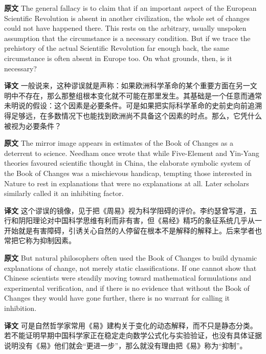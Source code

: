 \documentclass[UTF8,zihao=-4]{ctexart}
\newcommand{\BodyFont}{\fontsize{10.5pt}{15.5pt}\selectfont}
\newcommand{\origlabel}{\textbf{原文}\quad}
\newcommand{\translabel}{\textbf{译文}\quad}
\newenvironment{enblock}{\par\noindent\begingroup\BodyFont\origlabel}{\par\endgroup}
\newenvironment{zhblock}{\par\noindent\begingroup\BodyFont\translabel}{\par\endgroup\vspace{0.35em}}
\begin{document}
\begin{enblock}
The general fallacy is to claim that if an important aspect of the European Scientific Revolution is absent in another civilization, the whole set of changes could not have happened there. This rests on the arbitrary, usually unspoken assumption that the circumstance is a necessary condition. But if we trace the prehistory of the actual Scientific Revolution far enough back, the same circumstance is often absent in Europe too. On what grounds, then, is it necessary?
\end{enblock}
\begin{zhblock}
一般说来，这种谬误就是声称：如果欧洲科学革命的某个重要方面在另一文明中不存在，那么那整组根本变化就不可能在那里发生。其基础是一个任意而通常未明说的假设：这个因素是必要条件。可是如果把实际科学革命的史前史向前追溯得足够远，在多数情况下也能找到欧洲尚不具备这个因素的时点。那么，它凭什么被视为必要条件？
\end{zhblock}

\begin{enblock}
The mirror image appears in estimates of the Book of Changes as a deterrent to science. Needham once wrote that while Five-Element and Yin-Yang theories favoured scientific thought in China, the elaborate symbolic system of the Book of Changes was a mischievous handicap, tempting those interested in Nature to rest in explanations that were no explanations at all. Later scholars similarly called it an inhibiting factor.
\end{enblock}
\begin{zhblock}
这个谬误的镜像，见于把《周易》视为科学阻碍的评价。李约瑟曾写道，五行和阴阳理论对中国科学思维有利而非有害，但《易经》精巧的象征系统几乎从一开始就是有害障碍，引诱关心自然的人停留在根本不是解释的解释上。后来学者也常把它称为抑制因素。
\end{zhblock}

\begin{enblock}
But natural philosophers often used the Book of Changes to build dynamic explanations of change, not merely static classifications. If one cannot show that Chinese scientists were steadily moving toward mathematical formulations and experimental verification, and if there is no evidence that without the Book of Changes they would have gone further, there is no warrant for calling it inhibition.
\end{enblock}
\begin{zhblock}
可是自然哲学家常用《易》建构关于变化的动态解释，而不只是静态分类。若不能证明早期中国科学家正在稳定走向数学公式化与实验验证，也没有具体证据说明没有《易》他们就会“更进一步”，那么就没有理由把《易》称为“抑制”。
\end{zhblock}
\end{document}
